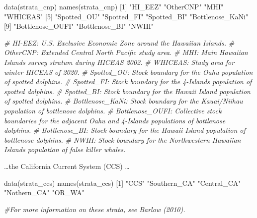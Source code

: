 \documentclass[
]{book}
\newenvironment{Shaded}{\begin{snugshade}}{\end{snugshade}}
\newcommand{\CommentTok}[1]{\textcolor[rgb]{0.56,0.35,0.01}{\textit{#1}}}
\newcommand{\DecValTok}[1]{\textcolor[rgb]{0.00,0.00,0.81}{#1}}
\newcommand{\FunctionTok}[1]{\textcolor[rgb]{0.00,0.00,0.00}{#1}}
\newcommand{\NormalTok}[1]{#1}
\newcommand{\StringTok}[1]{\textcolor[rgb]{0.31,0.60,0.02}{#1}}
\begin{document}
\begin{Shaded}
\begin{Highlighting}[]
\FunctionTok{data}\NormalTok{(strata\_cnp) }
\FunctionTok{names}\NormalTok{(strata\_cnp)}
\NormalTok{ [}\DecValTok{1}\NormalTok{] }\StringTok{"HI\_EEZ"}          \StringTok{"OtherCNP"}        \StringTok{"MHI"}             \StringTok{"WHICEAS"}        
\NormalTok{ [}\DecValTok{5}\NormalTok{] }\StringTok{"Spotted\_OU"}      \StringTok{"Spotted\_FI"}      \StringTok{"Spotted\_BI"}      \StringTok{"Bottlenose\_KaNi"}
\NormalTok{ [}\DecValTok{9}\NormalTok{] }\StringTok{"Bottlenose\_OUFI"} \StringTok{"Bottlenose\_BI"}   \StringTok{"NWHI"}           

\CommentTok{\# HI{-}EEZ: U.S. Exclusive Economic Zone around the Hawaiian Islands.}
\CommentTok{\# OtherCNP: Extended Central North Pacific study area.}
\CommentTok{\# MHI: Main Hawaiian Islands survey stratum during HICEAS 2002.}
\CommentTok{\# WHICEAS: Study area for winter HICEAS of 2020.}
\CommentTok{\# Spotted\_OU: Stock boundary for the Oahu population of spotted dolphins.}
\CommentTok{\# Spotted\_FI: Stock boundary for the 4{-}Islands population of spotted dolphins.}
\CommentTok{\# Spotted\_BI: Stock boundary for the Hawaii Island population of spotted dolphins.}
\CommentTok{\# Bottlenose\_KaNi: Stock boundary for the Kauai/Niihau population of bottlenose dolphins.}
\CommentTok{\# Bottlenose\_OUFI: Collective stock boundaries for the adjacent Oahu and 4{-}Islands populations of bottlenose dolphins.}
\CommentTok{\# Bottlenose\_BI: Stock boundary for the Hawaii Island population of bottlenose dolphins.}
\CommentTok{\# NWHI: Stock boundary for the Northwestern Hawaiian Islands population of false killer whales. }
\end{Highlighting}
\end{Shaded}

\ldots the California Current System (CCS) \ldots{}

\begin{Shaded}
\begin{Highlighting}[]
\FunctionTok{data}\NormalTok{(strata\_ccs) }
\FunctionTok{names}\NormalTok{(strata\_ccs)}
\NormalTok{[}\DecValTok{1}\NormalTok{] }\StringTok{"CCS"}         \StringTok{"Southern\_CA"} \StringTok{"Central\_CA"}  \StringTok{"Nothern\_CA"}  \StringTok{"OR\_WA"}      

\CommentTok{\#For more information on these strata, see Barlow (2010).}
\end{Highlighting}
\end{Shaded}
\end{document}

